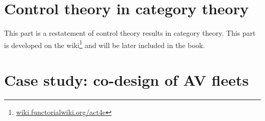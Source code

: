 \chapter{}

 



\part{Control theory in category theory}

This part is a restatement of control theory results in category theory.
This part is developed on the wiki\footnote{\href{https://wiki.functorialwiki.org/act4e/}{wiki.functorialwiki.org/act4e}} and will be later included in the book.



\part{Case study: co-design of AV fleets}

%
%
%
%
\printbibliography